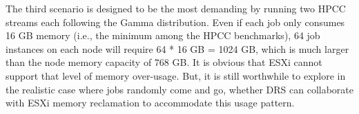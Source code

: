 
The third scenario is designed to be the most demanding by running two HPCC streams each following the Gamma distribution. 
Even if each job only consumes 16 GB memory (i.e., the minimum among the HPCC benchmarks), 64 job instances on each node will require 64 * 16 GB = 1024 GB, which is much larger than the node memory capacity of 768 GB. It is obvious that ESXi cannot support that level of memory over-usage. But, it is still worthwhile to explore in the realistic case where jobs randomly come and go, whether DRS can collaborate with ESXi memory reclamation to accommodate this usage pattern. 


